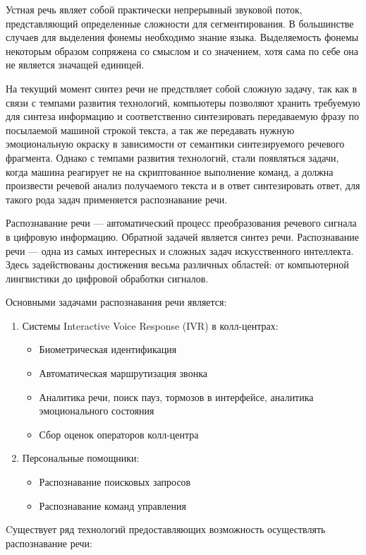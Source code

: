 Устная речь являет собой практически непрерывный звуковой поток, представляющий 
определенные сложности для сегментирования.
В большинстве случаев для выделения фонемы необходимо знание языка.
Выделяемость фонемы некоторым образом сопряжена со смыслом и со значением, хотя
сама по себе она не является значащей единицей.

На текущий момент синтез речи не предствляет собой сложную задачу, так как 
в связи с темпами развития технологий, компьютеры позволяют хранить требуемую для синтеза информацию
и соответственно синтезировать передаваемую фразу по посылаемой машиной строкой текста, а так же 
передавать нужную эмоциональную окраску в зависимости от семантики синтезируемого речевого фрагмента.
Однако с темпами развития технологий, стали появляться задачи, когда машина реагирует не на скриптованное 
выполнение команд, а должна произвести речевой анализ получаемого текста и в ответ синтезировать ответ, для такого 
рода задач применяется распознавание речи.

Распознавание речи — автоматический процесс преобразования речевого сигнала в цифровую информацию. Обратной задачей является синтез речи.
Распознавание речи — одна из самых интересных и сложных задач искусственного интеллекта. 
Здесь задействованы достижения весьма различных областей: от компьютерной лингвистики до цифровой обработки сигналов. 

Основными задачами распознавания речи является:
\begin{enumerate}
	\item Системы Interactive Voice Response (IVR) в колл-центрах:
	\begin{itemize}
		\item Биометрическая идентификация 
		\item Автоматическая маршрутизация звонка
		\item Аналитика речи, поиск пауз, тормозов в интерфейсе, аналитика эмоционального состояния
		\item Сбор оценок операторов колл-центра
	\end{itemize}
	\item Персональные помощники:
	\begin{itemize}
		\item Распознавание поисковых запросов
		\item Распознавание команд управления
	\end{itemize}
\end{enumerate}

Cуществует ряд технологий предоставляющих возможность осуществлять распознавание речи:

